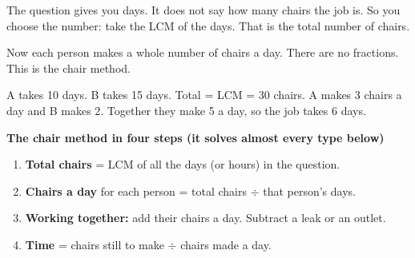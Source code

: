 \documentclass[11pt,a4paper]{article}
\newcommand{\infobox}[2]{\par\medskip\noindent\begingroup\setlength{\fboxsep}{7pt}%
  \colorbox{codebg}{\parbox{\dimexpr\linewidth-14pt\relax}{\textbf{\color{ember}#1}\par\smallskip #2}}\endgroup\par\medskip}
\begin{document}
The question gives you days. It does not say how many chairs the job is. So you choose the number: take the LCM of the days. That is the total number of chairs.

Now each person makes a whole number of chairs a day. There are no fractions. This is the chair method.

\begin{center}
\par\nopagebreak\smallskip
{\small A takes 10 days. B takes 15 days. Total = LCM = 30 chairs. A makes 3 chairs a day and B makes 2. Together they make 5 a day, so the job takes 6 days.}
\end{center}

\infobox{The chair method in four steps (it solves almost every type below)}{
\begin{enumerate}
\item \textbf{Total chairs} = LCM of all the days (or hours) in the question.
\item \textbf{Chairs a day} for each person = total chairs $\div$ that person's days.
\item \textbf{Working together:} add their chairs a day. Subtract a leak or an outlet.
\item \textbf{Time} = chairs still to make $\div$ chairs made a day.
\end{enumerate}}
\end{document}

